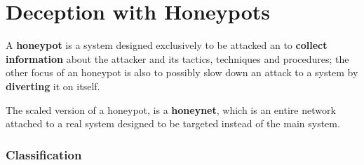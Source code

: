 \chapter{Deception with Honeypots}
A \textbf{honeypot} is a system designed exclusively to be attacked an to \textbf{collect information} about the attacker and its tactics, techniques and procedures;
the other focus of an honeypot is also to possibly slow down an attack to a system by \textbf{diverting} it on itself.

The scaled version of a honeypot, is a \textbf{honeynet},
which is an entire network attached to a real system designed to be targeted instead of the main system.

\subsection{Classification}
